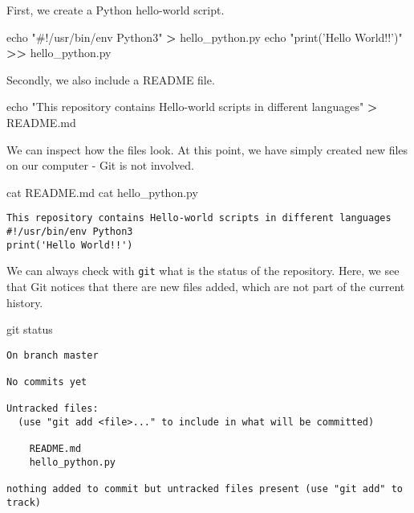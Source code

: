 \documentclass[]{article}
\newenvironment{Shaded}{\begin{snugshade}}{\end{snugshade}}
\newcommand{\BuiltInTok}[1]{#1}
\newcommand{\FunctionTok}[1]{\textcolor[rgb]{0.00,0.00,0.00}{#1}}
\newcommand{\NormalTok}[1]{#1}
\newcommand{\OperatorTok}[1]{\textcolor[rgb]{0.81,0.36,0.00}{\textbf{#1}}}
\newcommand{\StringTok}[1]{\textcolor[rgb]{0.31,0.60,0.02}{#1}}
\begin{document}
First, we create a Python hello-world script.

\begin{Shaded}
\begin{Highlighting}[]
\BuiltInTok{echo} \StringTok{"#!/usr/bin/env Python3"} \OperatorTok{>}\NormalTok{ hello_python.py}
\BuiltInTok{echo} \StringTok{"print('Hello World!!')"} \OperatorTok{>>}\NormalTok{ hello_python.py}
\end{Highlighting}
\end{Shaded}

Secondly, we also include a README file.

\begin{Shaded}
\begin{Highlighting}[]
\BuiltInTok{echo} \StringTok{"This repository contains Hello-world scripts in different languages"} \OperatorTok{>}\NormalTok{ README.md}
\end{Highlighting}
\end{Shaded}

We can inspect how the files look. At this point, we have simply created
new files on our computer - Git is not involved.

\begin{Shaded}
\begin{Highlighting}[]
\FunctionTok{cat}\NormalTok{ README.md}
\FunctionTok{cat}\NormalTok{ hello_python.py}
\end{Highlighting}
\end{Shaded}

\begin{verbatim}
This repository contains Hello-world scripts in different languages
#!/usr/bin/env Python3
print('Hello World!!')
\end{verbatim}

We can always check with \texttt{git} what is the status of the
repository. Here, we see that Git notices that there are new files
added, which are not part of the current history.

\begin{Shaded}
\begin{Highlighting}[]
\FunctionTok{git}\NormalTok{ status}
\end{Highlighting}
\end{Shaded}

\begin{verbatim}
On branch master

No commits yet

Untracked files:
  (use "git add <file>..." to include in what will be committed)

    README.md
    hello_python.py

nothing added to commit but untracked files present (use "git add" to track)
\end{verbatim}
\end{document}

